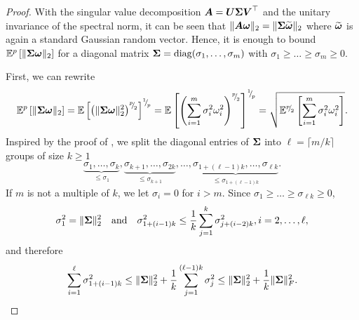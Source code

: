 \documentclass[12pt]{article}
\begin{document}
\begin{proof}
    With the singular value decomposition $\boldsymbol{A} = \boldsymbol{U} \boldsymbol{\Sigma} \boldsymbol{V}^{\top}$ and the unitary invariance of the spectral norm, it can be seen that $\lVert \boldsymbol{A} \boldsymbol{\omega} \rVert _2 = \lVert \boldsymbol{\Sigma} \widetilde{\boldsymbol{\omega}} \rVert _2$ where $\widetilde{\boldsymbol{\omega}}$ is again a standard Gaussian random vector. Hence, it is enough to bound $\mathbb{E}^{p}\left[ \lVert \boldsymbol{\Sigma} \boldsymbol{\omega} \rVert _2 \right]$ for a diagonal matrix $\boldsymbol{\Sigma} = \operatorname{diag}(\sigma_1, \dots, \sigma_m)$ with $\sigma_1 \geq \dots \geq \sigma_m \geq 0$.

    First, we can rewrite
    \begin{equation}
        \mathbb{E}^{p}\left[ \lVert \mtx{\Sigma} \vct{\omega} \rVert _2 \right]
        = \mathbb{E}\left[  \left( \lVert \mtx{\Sigma} \vct{\omega} \rVert _2^2 \right)^{\sfrac{p}{2}} \right]^{\sfrac{1}{p}}
        = \mathbb{E}\left[  \left( \sum_{i=1}^{m} \sigma_i^2 \omega_i^2 \right)^{\sfrac{p}{2}} \right]^{\sfrac{1}{p}}
        = \sqrt{ \mathbb{E}^{\sfrac{p}{2}}\left[ \sum_{i=1}^{m} \sigma_i^2 \omega_i^2 \right] }.
        \label{equ:matvec-spectral-norm-simplification}
    \end{equation}
    Inspired by the proof of \cite[theorem 1]{cohen-2016-optimal-approximate}, we split the diagonal entries of $\boldsymbol{\Sigma}$ into $\ell = \lceil m/k \rceil$ groups of size $k \geq 1$
    \begin{equation}
        \underbrace{\sigma_1, \dots, \sigma_k}_{\leq \sigma_1}, \underbrace{\sigma_{k+1}, \dots, \sigma_{2k}}_{\leq \sigma_{k+1}}, \dots, \underbrace{\sigma_{1+(\ell - 1)k}, \dots, \sigma_{\ell k}}_{\leq \sigma_{1+(\ell - 1)k}}.
    \end{equation}
    If $m$ is not a multiple of $k$, we let $\sigma_i = 0$ for $i > m$. Since $\sigma_1 \geq \dots \geq \sigma_{\ell k} \geq 0$,
    \begin{equation}
        \sigma_1^2 = \lVert \boldsymbol{\Sigma} \rVert _2^2
        \quad \text{and} \quad
        \sigma_{1 + (i-1)k}^2 \leq \frac{1}{k} \sum_{j=1}^{k} \sigma_{j + (i-2)k}^2, i = 2, \dots, \ell,
    \end{equation}
    and therefore
    \begin{equation}
        \sum_{i=1}^{\ell} \sigma_{1 + (i-1)k}^2 \leq \lVert \mtx{\Sigma} \rVert _2^2 + \frac{1}{k} \sum_{j=1}^{(\ell - 1)k} \sigma_j^2 \leq \lVert \mtx{\Sigma} \rVert _2^2 + \frac{1}{k} \lVert \mtx{\Sigma} \rVert _F^2.
        \label{equ:singular-value-group-bound}

\end{equation}
\end{proof}
\end{document}
